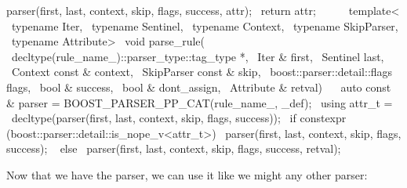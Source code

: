 \documentclass{MyBook}
\begin{document}
\begin{code}
{{            parser(first, last, context, skip, flags, success, attr);          \
            return attr;                                                       \
        }                                                                      \
    }                                                                          \
                                                                               \
    template<                                                                  \
        typename Iter,                                                         \
        typename Sentinel,                                                     \
        typename Context,                                                      \
        typename SkipParser,                                                   \
        typename Attribute>                                                    \
    void parse_rule(                                                           \
        decltype(rule_name_)::parser_type::tag_type *,                         \
        Iter & first,                                                          \
        Sentinel last,                                                         \
        Context const & context,                                               \
        SkipParser const & skip,                                               \
        boost::parser::detail::flags flags,                                    \
        bool & success,                                                        \
        bool & dont_assign,                                                    \
        Attribute & retval)                                                    \
    {                                                                          \
        auto const & parser = BOOST_PARSER_PP_CAT(rule_name_, _def);           \
        using attr_t =                                                         \
            decltype(parser(first, last, context, skip, flags, success));      \
        if constexpr (boost::parser::detail::is_nope_v<attr_t>) {              \
            parser(first, last, context, skip, flags, success);                \
        } else {                                                               \
            parser(first, last, context, skip, flags, success, retval);        \
        }                                                                      \
    }
\end{code}

Now that we have the \ci{doubles} parser, we can use it like we might any other parser:
\end{document}
